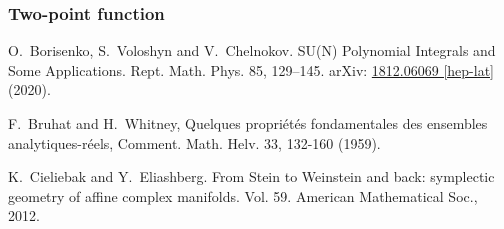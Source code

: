 \documentclass[a4paper,11pt]{article}
\theoremstyle{definition}
\begin{document}
\subsubsection{Two-point function}
\begin{thebibliography}{99}
   O.\ Borisenko, S.\  Voloshyn and V.\ Chelnokov. SU(N) Polynomial Integrals and Some Applications. Rept. Math. Phys. 85, 129–145. arXiv: \href{https://arxiv.org/abs/1812.06069}{1812.06069 [hep-lat]} (2020).

   F.\ Bruhat and H.\ Whitney, Quelques propri\'et\'es fondamentales des ensembles analytiques-r\'eels, Comment. Math. Helv. 33, 132-160 (1959).

   K.\ Cieliebak and Y.\ Eliashberg. From Stein to Weinstein and back: symplectic geometry of affine complex manifolds. Vol. 59. American Mathematical Soc., 2012.
\end{thebibliography}
\end{document}
